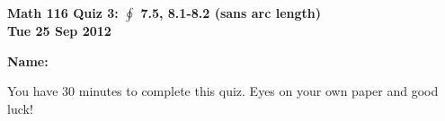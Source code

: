 \documentclass[11pt,letterpaper]{article}
\begin{document}
\flushleft
\begin{multicols}{2}


\begin{large}\textbf{Math 116 Quiz 3: $\oint$ 7.5, 8.1-8.2 (sans arc length) \\
Tue 25 Sep 2012}\end{large}

\textbf{Name:  }\underline{\hspace{4pc}{\bf SOLUTIONS}\hspace{4pc}}
\vspace{.5in}

\end{multicols}

\pagestyle{empty}

\flushleft

You have 30 minutes to complete this quiz.  Eyes on your own paper and good luck!
\end{document}
